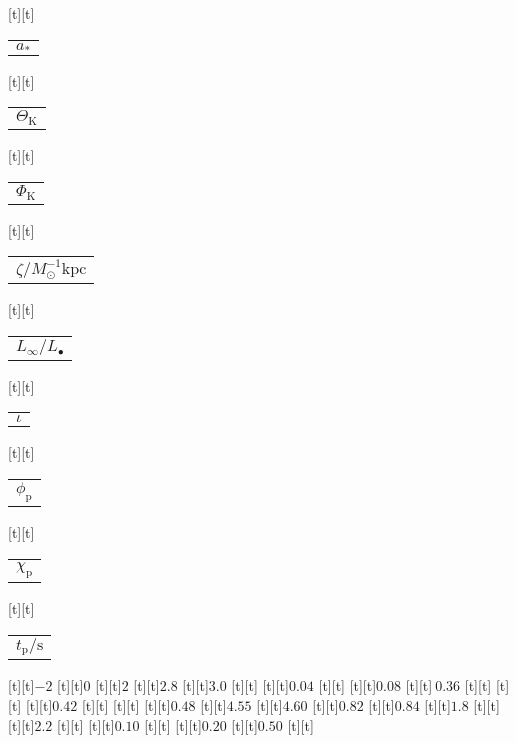\begin{psfrags}
[t][t]{\color[rgb]{0,0,0}\setlength{\tabcolsep}{0pt}\begin{tabular}{c}{$a_\ast$}\end{tabular}}%
[t][t]{\color[rgb]{0,0,0}\setlength{\tabcolsep}{0pt}\begin{tabular}{c}{$\Theta_\mathrm{K}$}\end{tabular}}%
[t][t]{\color[rgb]{0,0,0}\setlength{\tabcolsep}{0pt}\begin{tabular}{c}{$\Phi_\mathrm{K}$}\end{tabular}}%
[t][t]{\color[rgb]{0,0,0}\setlength{\tabcolsep}{0pt}\begin{tabular}{c}{$\zeta/M_\odot^{-1} \mathrm{kpc}$}\end{tabular}}%
[t][t]{\color[rgb]{0,0,0}\setlength{\tabcolsep}{0pt}\begin{tabular}{c}{$L_\infty/L_\bullet$}\end{tabular}}%
[t][t]{\color[rgb]{0,0,0}\setlength{\tabcolsep}{0pt}\begin{tabular}{c}{$\iota$}\end{tabular}}%
[t][t]{\color[rgb]{0,0,0}\setlength{\tabcolsep}{0pt}\begin{tabular}{c}{$\phi_\mathrm{p}$}\end{tabular}}%
[t][t]{\color[rgb]{0,0,0}\setlength{\tabcolsep}{0pt}\begin{tabular}{c}{$\chi_\mathrm{p}$}\end{tabular}}%
[t][t]{\color[rgb]{0,0,0}\setlength{\tabcolsep}{0pt}\begin{tabular}{c}{$t_\mathrm{p}/\mathrm{s}$}\end{tabular}}%
%
[t][t]{$-2$}%
[t][t]{$0$}%
[t][t]{$2$}%
[t][t]{$2.8$}%
[t][t]{$3.0$}%
[t][t]{}%
[t][t]{$0.04$}%
[t][t]{}%
[t][t]{$0.08$}%
[t][t]{$\:0.36$}%
[t][t]{}%
[t][t]{}%
[t][t]{$0.42$}%
[t][t]{}%
[t][t]{}%
[t][t]{$0.48$}%
[t][t]{$4.55$}%
[t][t]{$4.60$}%
[t][t]{$0.82$}%
[t][t]{$0.84$}%
[t][t]{$1.8$}%
[t][t]{}%
[t][t]{$2.2$}%
[t][t]{}%
[t][t]{$0.10$}%
[t][t]{}%
[t][t]{$0.20$}%
[t][t]{$0.50$}%
[t][t]{}%

\end{psfrags}
